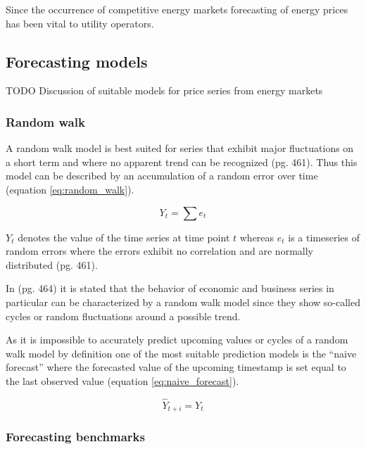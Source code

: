 Since the occurrence of competitive energy markets forecasting of energy prices has been vital to utility operators. 


\subsection{Forecasting models}

TODO Discussion of suitable models for price series from energy markets


\subsubsection{Random walk}

A random walk model is best suited for series that exhibit major fluctuations on a short term and where no apparent trend can be recognized \cite{makridakisforecasting}(pg. 461). Thus this model can be described by an accumulation of a random error over time (equation \ref{eq:random_walk}). 

\begin{equation} \label{eq:random_walk}
Y_t = \sum e_t
\end{equation}

$Y_t$ denotes the value of the time series at time point $t$ whereas $e_t$ is a timeseries of random errors where the errors exhibit no correlation and are normally distributed \cite{makridakisforecasting}(pg. 461). 

In \cite{makridakisforecasting}(pg. 464) it is stated that the behavior of economic and business series in particular can be characterized by a random walk model since they show so-called cycles or random fluctuations around a possible trend. 

As it is impossible to accurately predict upcoming values or cycles of a random walk model by definition one of the most suitable prediction models is the ``naive forecast'' where the forecasted value of the upcoming timestamp is set equal to the last observed value (equation \ref{eq:naive_forecast}).

\begin{equation} \label{eq:naive_forecast}
\hat{Y}_{t+i} = Y_t
\end{equation}



\subsubsection{Forecasting benchmarks}



